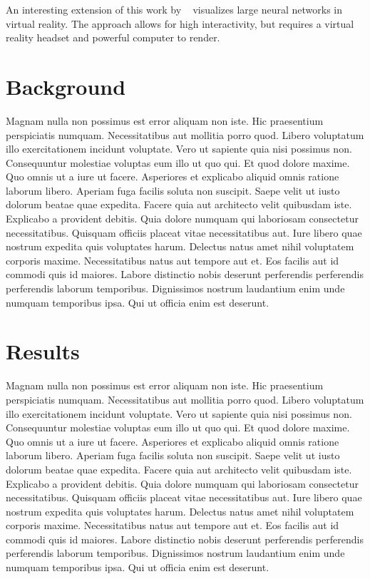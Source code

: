 \documentclass{acmsiggraph}
\begin{document}
An interesting extension of this work by ~\cite{linse2022walk} visualizes large neural networks in virtual reality. The approach allows for high interactivity, but requires a virtual reality headset and powerful computer to render.


\section{Background}
\label{sec:intro}

Magnam nulla non possimus est error aliquam non iste. Hic praesentium perspiciatis numquam. Necessitatibus aut mollitia porro quod. Libero voluptatum illo exercitationem incidunt voluptate. Vero ut sapiente quia nisi possimus non. Consequuntur molestiae voluptas eum illo ut quo qui.
Et quod dolore maxime. Quo omnis ut a iure ut facere. Asperiores et explicabo aliquid omnis ratione laborum libero. Aperiam fuga facilis soluta non suscipit.
Saepe velit ut iusto dolorum beatae quae expedita. Facere quia aut architecto velit quibusdam iste. Explicabo a provident debitis. Quia dolore numquam qui laboriosam consectetur necessitatibus.
Quisquam officiis placeat vitae necessitatibus aut. Iure libero quae nostrum expedita quis voluptates harum. Delectus natus amet nihil voluptatem corporis maxime. Necessitatibus natus aut tempore aut et.
Eos facilis aut id commodi quis id maiores. Labore distinctio nobis deserunt perferendis perferendis perferendis laborum temporibus. Dignissimos nostrum laudantium enim unde numquam temporibus ipsa. Qui ut officia enim est deserunt.


\section{Results}
\label{sec:intro}

Magnam nulla non possimus est error aliquam non iste. Hic praesentium perspiciatis numquam. Necessitatibus aut mollitia porro quod. Libero voluptatum illo exercitationem incidunt voluptate. Vero ut sapiente quia nisi possimus non. Consequuntur molestiae voluptas eum illo ut quo qui.
Et quod dolore maxime. Quo omnis ut a iure ut facere. Asperiores et explicabo aliquid omnis ratione laborum libero. Aperiam fuga facilis soluta non suscipit.
Saepe velit ut iusto dolorum beatae quae expedita. Facere quia aut architecto velit quibusdam iste. Explicabo a provident debitis. Quia dolore numquam qui laboriosam consectetur necessitatibus.
Quisquam officiis placeat vitae necessitatibus aut. Iure libero quae nostrum expedita quis voluptates harum. Delectus natus amet nihil voluptatem corporis maxime. Necessitatibus natus aut tempore aut et.
Eos facilis aut id commodi quis id maiores. Labore distinctio nobis deserunt perferendis perferendis perferendis laborum temporibus. Dignissimos nostrum laudantium enim unde numquam temporibus ipsa. Qui ut officia enim est deserunt.
\end{document}
